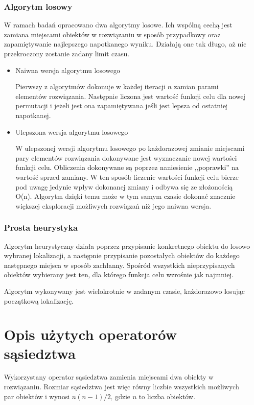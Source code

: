 \documentclass{article}
\begin{document}
\subsubsection{Algorytm losowy}
W ramach badań opracowano dwa algorytmy losowe. Ich wspólną cechą jest zamiana miejscami obiektów w rozwiązaniu w sposób przypadkowy oraz zapamiętywanie najlepszego napotkanego wyniku. Działają one tak długo, aż nie przekroczony zostanie zadany limit czasu.
\begin{itemize}
    \item Naiwna wersja algorytmu losowego
    
    Pierwszy z algorytmów dokonuje w każdej iteracji $n$ zamian parami elementów rozwiązania. Następnie liczona jest wartość funkcji celu dla nowej permutacji i jeżeli jest ona zapamiętywana jeśli jest lepsza od ostatniej napotkanej.
    \item Ulepszona wersja algorytmu losowego
    
    W ulepszonej wersji algorytmu losowego po każdorazowej zmianie miejscami pary elementów rozwiązania dokonywane jest wyznaczanie nowej wartości funkcji celu. Obliczenia dokonywane są poprzez naniesienie ,,poprawki'' na wartość sprzed zamiany. W ten sposób liczenie wartości funkcji celu bierze pod uwagę jedynie wpływ dokonanej zmiany i odbywa się ze złożonością O(n). Algorytm dzięki temu może w tym samym czasie dokonać znacznie większej eksploracji możliwych rozwiązań niż jego naiwna wersja.
\end{itemize}
\subsubsection{Prosta heurystyka}
Algorytm heurystyczny działa poprzez przypisanie konkretnego obiektu do losowo wybranej lokalizacji, a następnie przypisanie pozostałych obiektów do każdego następnego miejsca w sposób zachłanny. Spośród wszystkich nieprzypisanych obiektów wybierany jest ten, dla którego funkcja celu wzrośnie jak najmniej.
\par Algorytm wykonywany jest wielokrotnie w zadanym czasie, każdorazowo losując początkową lokalizację.
\section{Opis użytych operatorów sąsiedztwa}
Wykorzystany operator sąsiedztwa zamienia miejscami dwa obiekty w rozwiązaniu. Rozmiar sąsiedztwa jest więc równy liczbie wszystkich możliwych par obiektów i wynosi $n(n-1)/2$, gdzie $n$ to liczba obiektów.
\end{document}
